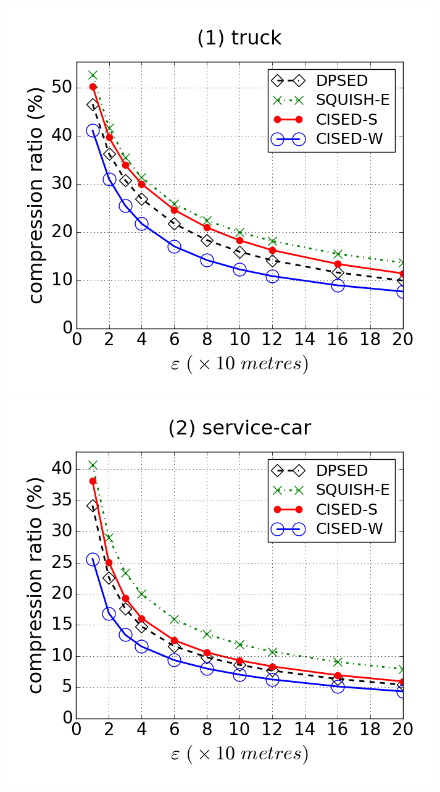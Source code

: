 \begin{figure}[tb!]
\centering
\includegraphics[scale = 0.240]{figures/Exp-cr-epsilon-truck.png}
\includegraphics[scale = 0.240]{figures/Exp-cr-epsilon-service.png}

\end{figure}

